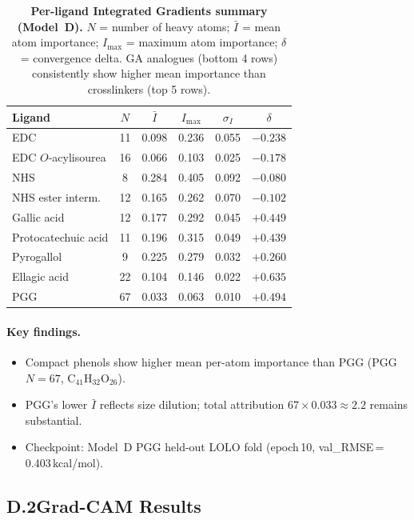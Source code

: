 \documentclass[11pt]{article}
\begin{document}
\begin{table}[H]
\small
\centering
\caption{\textbf{Per-ligand Integrated Gradients summary (Model~D).}
  $N$ = number of heavy atoms; $\bar{I}$ = mean atom importance;
  $I_{\max}$ = maximum atom importance; $\delta$ = convergence delta.
  GA analogues (bottom 4 rows) consistently show higher mean
  importance than crosslinkers (top 5 rows).}
\label{tab:app_perlig_ig}
\begin{tabular}{lccccc}
\toprule
\textbf{Ligand} & $N$ & $\bar{I}$ & $I_{\max}$
  & $\sigma_I$ & $\delta$ \\
\midrule
EDC                  & 11 & 0.098 & 0.236 & 0.055 & $-0.238$ \\
EDC $O$-acylisourea  & 16 & 0.066 & 0.103 & 0.025 & $-0.178$ \\
NHS                  &  8 & 0.284 & 0.405 & 0.092 & $-0.080$ \\
NHS ester interm.    & 12 & 0.165 & 0.262 & 0.070 & $-0.102$ \\
\midrule
Gallic acid          & 12 & 0.177 & 0.292 & 0.045 & $+0.449$ \\
Protocatechuic acid  & 11 & 0.196 & 0.315 & 0.049 & $+0.439$ \\
Pyrogallol           &  9 & 0.225 & 0.279 & 0.032 & $+0.260$ \\
Ellagic acid         & 22 & 0.104 & 0.146 & 0.022 & $+0.635$ \\
PGG                  & 67 & 0.033 & 0.063 & 0.010 & $+0.494$ \\
\bottomrule
\end{tabular}
\end{table}

\paragraph{Key findings.}
\begin{itemize}[leftmargin=1.5em]
  \item Compact phenols show higher mean per-atom importance than PGG
    (PGG $N{=}67$, C$_{41}$H$_{32}$O$_{26}$).
  \item PGG's lower $\bar{I}$ reflects size dilution; total attribution
    $67 \times 0.033 \approx 2.2$ remains substantial.
  \item Checkpoint: Model~D PGG held-out LOLO fold (epoch\,10,
    val\_RMSE\,=\,0.403\,kcal/mol).
\end{itemize}

\subsection*{D.2\quad Grad-CAM Results}
\end{document}
